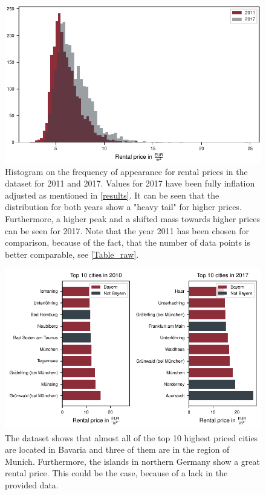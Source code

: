 \documentclass{article}
\begin{document}
		\begin{figure}[htp]
		\centering
		\includegraphics[width=0.7\linewidth]{../fig/figures/Histogram_rental_prices.pdf}
		\caption{Histogram on the frequency of appearance for rental prices in the dataset for 2011 and 2017. Values for 2017 have been fully inflation adjusted as mentioned in \cref{results}. It can be seen that the distribution for both years show a "heavy tail" for higher prices. Furthermore, a higher peak and a shifted mass towards higher prices can be seen for 2017. Note that the year 2011 has been chosen for comparison, because of the fact, that the number of data points is better comparable, see \cref{Table_raw}.}
		\label{histogram_rental_prices}
		\end{figure}


	\begin{figure}[htp]
	\centering
	\includegraphics[width=0.9\linewidth]{../fig/figures/barchart_city_comparison.pdf}
	\caption{The dataset shows that almost all of the top 10 highest priced cities are located in Bavaria and three of them are in the region of Munich. Furthermore, the islands in northern Germany show a great rental price. This could be the case, because of a lack in the provided data.}
	\label{barchart_city_comparison}
	\end{figure}
\end{document}
